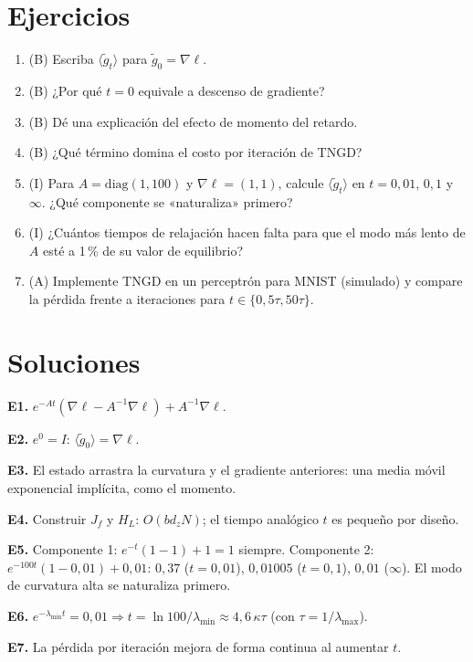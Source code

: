 \documentclass[11pt,a4paper]{article}
\begin{document}
\section{Ejercicios}
\begin{enumerate}[label=\textbf{E\arabic*.}]
\item (B) Escriba $\langle\tilde g_t\rangle$ para $\tilde g_0=\nabla\ell$.
\item (B) ¿Por qué $t=0$ equivale a descenso de gradiente?
\item (B) Dé una explicación del efecto de momento del retardo.
\item (B) ¿Qué término domina el costo por iteración de TNGD?
\item (I) Para $A=\mathrm{diag}(1,100)$ y $\nabla\ell=(1,1)$, calcule $\langle\tilde g_t\rangle$ en $t=0{,}01$, $0{,}1$ y $\infty$. ¿Qué componente se «naturaliza» primero?
\item (I) ¿Cuántos tiempos de relajación hacen falta para que el modo más lento de $A$ esté a 1\,\% de su valor de equilibrio?
\item (A) Implemente TNGD en un perceptrón para MNIST (simulado) y compare la pérdida frente a iteraciones para $t\in\{0,5\tau,50\tau\}$.
\end{enumerate}
\section{Soluciones}
\begin{solucion}
\textbf{E1.} $e^{-At}(\nabla\ell-A^{-1}\nabla\ell)+A^{-1}\nabla\ell$.

\textbf{E2.} $e^{0}=I$: $\langle\tilde g_0\rangle=\nabla\ell$.

\textbf{E3.} El estado arrastra la curvatura y el gradiente anteriores: una media móvil exponencial implícita, como el momento.

\textbf{E4.} Construir $J_f$ y $H_L$: $O(bd_zN)$; el tiempo analógico $t$ es pequeño por diseño.

\textbf{E5.} Componente 1: $e^{-t}(1-1)+1=1$ siempre. Componente 2: $e^{-100t}(1-0{,}01)+0{,}01$: $0{,}37$ ($t=0{,}01$), $0{,}01005$ ($t=0{,}1$), $0{,}01$ ($\infty$).
El modo de curvatura alta se naturaliza primero.

\textbf{E6.} $e^{-\lambda_{\min}t}=0{,}01\Rightarrow t=\ln100/\lambda_{\min}\approx4{,}6\,\kappa\tau$ (con $\tau=1/\lambda_{\max}$).

\textbf{E7.} La pérdida por iteración mejora de forma continua al aumentar $t$.
\end{solucion}
\end{document}
